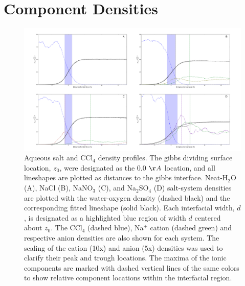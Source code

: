 \section{Component Densities}

\begin{figure}[h!]
\begin{center}
	\includegraphics[scale=0.16]{images/densities.png}
	\caption{Aqueous salt and CCl$_4$ density profiles. The gibbs dividing surface location, $z_0$, were designated as the 0.0 $\AA$ location, and all lineshapes are plotted as distances to the gibbs interface. Neat-H$_2$O (A), NaCl (B), NaNO$_3$ (C), and Na$_2$SO$_4$ (D) salt-system densities are plotted with the water-oxygen density (dashed black) and the corresponding fitted lineshape (solid black). Each interfacial width, $d$, is designated as a highlighted blue region of width $d$ centered about $z_0$. The CCl$_4$ (dashed blue), Na$^+$ cation (dashed green) and respective anion densities are also shown for each system. The scaling of the cation (10x) and anion (5x) densities was used to clarify their peak and trough locations. The maxima of the ionic components are marked with dashed vertical lines of the same colors to show relative component locations within the interfacial region.}
	\label{fig:density-plots}
\end{center}
\end{figure}

